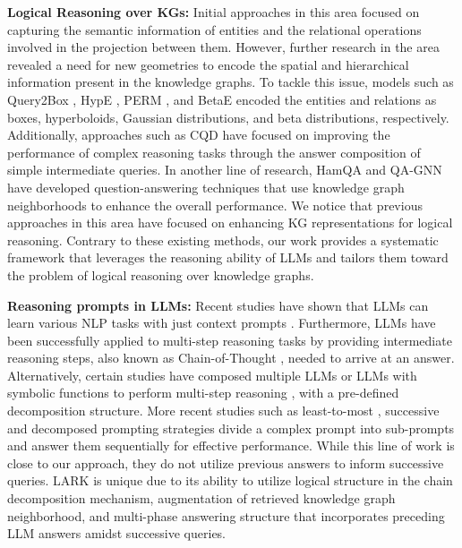 \documentclass{article} %
\newcommand{\model}{LARK}
\begin{document}
\textbf{Logical Reasoning over KGs:} Initial approaches in this area \citep{bordes2013translating, nickel2011a, das2017chains, hamilton2018embedding} focused on capturing the semantic information of entities and the relational operations involved in the projection between them. However, further research in the area revealed a need for new geometries to encode the spatial and hierarchical information present in the knowledge graphs. To tackle this issue, models such as Query2Box \citep{ren2020query2box}, HypE \citep{choudhary2021self}, PERM \citep{choudhary2021probabilistic}, and BetaE \citep{ren2020beta} encoded the entities and relations as boxes, hyperboloids, Gaussian distributions, and beta distributions, respectively. Additionally, approaches such as CQD \citep{arakelyan2021complex} have focused on improving the performance of complex reasoning tasks through the answer composition of simple intermediate queries. In another line of research, HamQA \citep{dong2023hierarchy} and QA-GNN \citep{yasunaga2021qa} have developed question-answering techniques that use knowledge graph neighborhoods to enhance the overall performance. We notice that previous approaches in this area have focused on enhancing KG representations for logical reasoning. Contrary to these existing methods, our work provides a systematic framework that leverages the reasoning ability of LLMs and tailors them toward the problem of logical reasoning over knowledge graphs.

\textbf{Reasoning prompts in LLMs:} Recent studies have shown that LLMs can learn various NLP {tasks with just context prompts} \citep{brown2020language}. Furthermore, LLMs have been successfully applied to multi-step reasoning tasks by providing intermediate reasoning steps, also known as Chain-of-Thought \citep{wei2022chain, chowdhery2022palm}, needed to arrive at an answer. Alternatively, certain studies have composed multiple LLMs or LLMs with symbolic functions to perform multi-step reasoning \citep{jung2022maieutic, creswell2023selectioninference}, with a pre-defined decomposition structure. More recent studies such as least-to-most \citep{zhou2023leasttomost}, successive \citep{dua2022successive} and decomposed \citep{khot2023decomposed} prompting strategies divide a complex prompt into sub-prompts and answer them sequentially for effective performance. While this line of work is close to our approach, they do not utilize previous answers to inform successive queries. {\model} is unique due to its ability to utilize logical structure in the chain decomposition mechanism, augmentation of retrieved knowledge graph neighborhood, and multi-phase answering structure that incorporates preceding LLM answers amidst successive queries.
\end{document}
